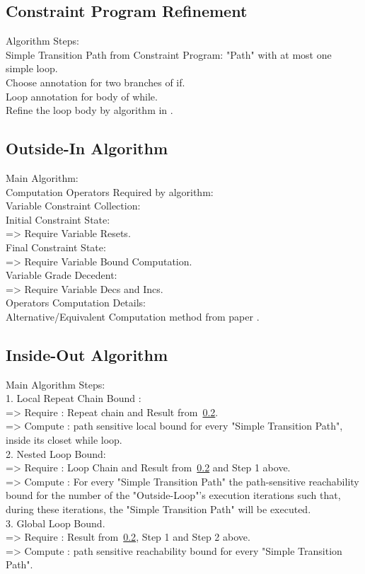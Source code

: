 \documentclass[sigplan,10pt,review,anonymous]{acmart}
\begin{document}
\subsection{Constraint Program Refinement}
Algorithm Steps:
\\
Simple Transition Path from Constraint Program: "Path" with at most one simple loop.
\\
Choose annotation for two branches of if.
\\
Loop annotation for body of while.
\\
Refine the loop body by algorithm in \cite{GulwaniJK09}.
%
\subsection{Outside-In Algorithm}
\label{sec:outsidein}
Main Algorithm:
\\
Computation Operators Required by algorithm:
\\
Variable Constraint Collection:
\\
Initial Constraint State:
\\
=> Require Variable Resets.
\\
Final Constraint State:
\\
 => Require Variable Bound Computation.
\\
Variable Grade Decedent:
\\
 => Require Variable Decs and Incs.
\\
Operators Computation Details:
\\
Alternative/Equivalent Computation method from paper \cite{GulwaniJK09}.
\subsection{Inside-Out Algorithm}
\label{sec:insideout}
Main Algorithm Steps:
\\
1. Local Repeat Chain Bound :
\\
=> Require : Repeat chain and Result from~\ref{sec:outsidein}.
\\
=> Compute : path sensitive local bound for every "Simple Transition Path", inside its closet while loop.
\\
2. Nested Loop Bound:
\\
=> Require : Loop Chain and Result from~\ref{sec:outsidein} and Step 1 above.
\\
=> Compute : For every "Simple Transition Path" the path-sensitive
reachability bound for the number of the "Outside-Loop"'s execution iterations
such that, during these iterations, the "Simple Transition Path" will be executed. 
\\
3. Global Loop Bound.
\\
=> Require : Result from~\ref{sec:outsidein}, Step 1 and Step 2 above.
\\
=> Compute : path sensitive reachability bound for every "Simple Transition Path".
%
\end{document}
